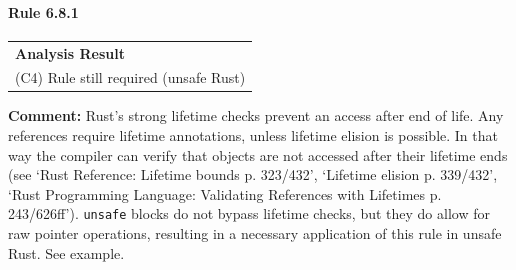 \paragraph{Rule 6.8.1}
\begin{longtable}{p{13cm}}
\textbf{Analysis Result} \\
(C4) Rule still required (unsafe Rust) \\
\end{longtable}
\textbf{Comment:} Rust's strong lifetime checks prevent an access after end of life. Any references require lifetime annotations, unless lifetime elision is possible. In that way the compiler can verify that objects are not accessed after their lifetime ends (see `Rust Reference: Lifetime bounds p. 323/432', `Lifetime elision p. 339/432', `Rust Programming Language: Validating References with Lifetimes p. 243/626ff'). \texttt{unsafe} blocks do not bypass lifetime checks, but they do allow for raw pointer operations, resulting in a necessary application of this rule in unsafe Rust. See example. \\



